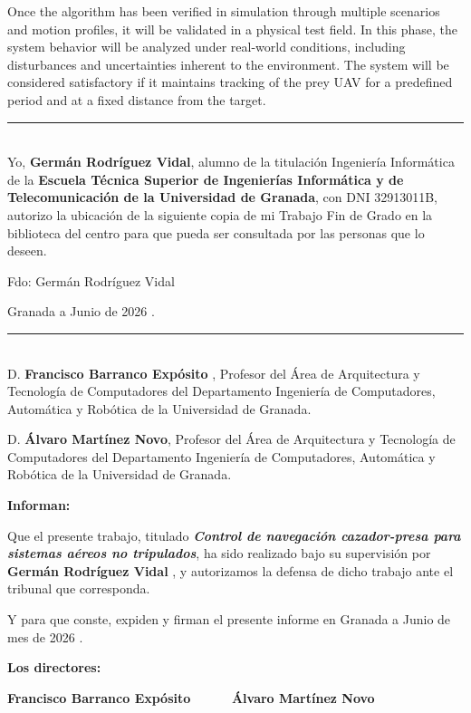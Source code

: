 Once the algorithm has been verified in simulation through multiple scenarios and motion profiles, it will be validated in a physical test field. In this phase, the system behavior will be analyzed under real-world conditions, including disturbances and uncertainties inherent to the environment. The system will be considered satisfactory if it maintains tracking of the prey UAV for a predefined period and at a fixed distance from the target.

\endgroup
\clearpage

\noindent\rule[-1ex]{\textwidth}{2pt}\\[4.5ex]

Yo, \textbf{Germán Rodríguez Vidal}, alumno de la titulación Ingeniería Informática de la \textbf{Escuela Técnica Superior
de Ingenierías Informática y de Telecomunicación de la Universidad de Granada}, con DNI 32913011B, autorizo la
ubicación de la siguiente copia de mi Trabajo Fin de Grado en la biblioteca del centro para que pueda ser
consultada por las personas que lo deseen.

\vspace{6cm}

\noindent Fdo: Germán Rodríguez Vidal

\vspace{2cm}

\begin{flushright}
Granada a Junio de 2026 .
\end{flushright}


\clearpage

\noindent\rule[-1ex]{\textwidth}{2pt}\\[4.5ex]

D. \textbf{Francisco Barranco Expósito }, Profesor del Área de Arquitectura y Tecnología de Computadores del Departamento Ingeniería de Computadores, Automática y Robótica de la Universidad de Granada.

\vspace{0.5cm}

D. \textbf{Álvaro Martínez Novo}, Profesor del Área de Arquitectura y Tecnología de Computadores del Departamento Ingeniería de Computadores, Automática y Robótica de la Universidad de Granada.


\vspace{0.5cm}

\textbf{Informan:}

\vspace{0.5cm}

Que el presente trabajo, titulado \textit{\textbf{Control de navegación cazador-presa para sistemas aéreos no tripulados}},
ha sido realizado bajo su supervisión por \textbf{Germán Rodríguez Vidal }, y autorizamos la defensa de dicho trabajo ante el tribunal
que corresponda.

\vspace{0.5cm}

Y para que conste, expiden y firman el presente informe en Granada a Junio de mes de 2026 .

\vspace{1cm}

\textbf{Los directores:}

\vspace{5cm}

\noindent \textbf{Francisco Barranco Expósito  \ \ \ \ \ Álvaro Martínez Novo }


